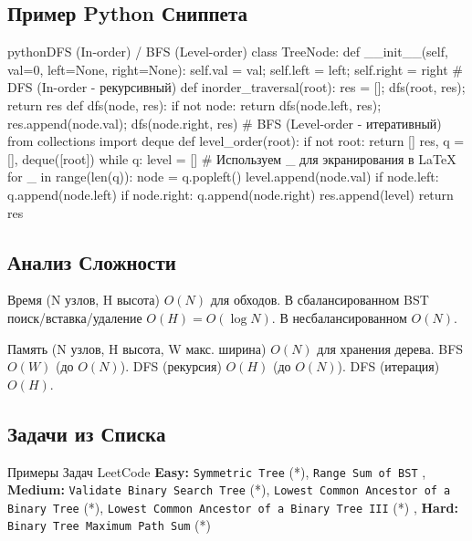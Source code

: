 \subsection{Пример Python Сниппета}
\begin{codebox}{python}{DFS (In-order) / BFS (Level-order)}
class TreeNode:
    def __init__(self, val=0, left=None, right=None):
        self.val = val; self.left = left; self.right = right
# DFS (In-order - рекурсивный)
def inorder_traversal(root):
    res = []; dfs(root, res); return res
def dfs(node, res):
    if not node: return
    dfs(node.left, res); res.append(node.val); dfs(node.right, res)
# BFS (Level-order - итеративный)
from collections import deque
def level_order(root):
    if not root: return []
    res, q = [], deque([root])
    while q:
        level = []
        # Используем \_ для экранирования в LaTeX
        for \_ in range(len(q)):
            node = q.popleft()
            level.append(node.val)
            if node.left: q.append(node.left)
            if node.right: q.append(node.right)
        res.append(level)
    return res
\end{codebox}

\subsection{Анализ Сложности}
\begin{myblock}{Время {(N узлов, H высота)}}
    $O(N)$ для обходов. В сбалансированном BST поиск/вставка/удаление $O(H) = O(\log N)$. В несбалансированном $O(N)$.
\end{myblock}
\begin{myblock}{Память {(N узлов, H высота, W макс. ширина)}}
    $O(N)$ для хранения дерева. BFS $O(W)$ (до $O(N)$). DFS (рекурсия) $O(H)$ (до $O(N)$). DFS (итерация) $O(H)$.
\end{myblock}

\subsection{Задачи из Списка}
\begin{myblock}{Примеры Задач LeetCode}
    \textbf{Easy:} \texttt{Symmetric Tree} (*), \texttt{Range Sum of BST} \sep
    \textbf{Medium:} \texttt{Validate Binary Search Tree} (*), \texttt{Lowest Common Ancestor of a Binary Tree} (*), \texttt{Lowest Common Ancestor of a Binary Tree III} (*) \sep
    \textbf{Hard:} \texttt{Binary Tree Maximum Path Sum} (*)
\end{myblock}

